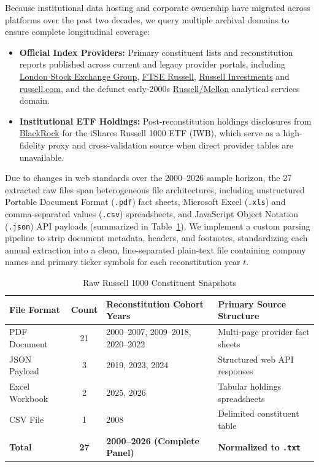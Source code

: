 \medskip

Because institutional data hosting and corporate ownership have migrated across platforms over the past two decades, we query multiple archival domains to ensure complete longitudinal coverage:
\begin{itemize}
	\item \textbf{Official Index Providers:} Primary constituent lists and reconstitution reports published across current and legacy provider portals, including \href{https://lseg.com/}{London Stock Exchange Group}, \href{https://ftserussell.com/}{FTSE Russell}, \href{https://russellinvestments.com/}{Russell Investments} and \href{https://russell.com/}{russell.com}, and the defunct early-2000s \href{https://www.russellmellon.com/}{Russell/Mellon} analytical services domain.
	\item \textbf{Institutional ETF Holdings:} Post-reconstitution holdings disclosures from \href{https://ishares.com/}{BlackRock} for the iShares Russell 1000 ETF (IWB), which serve as a high-fidelity proxy and cross-validation source when direct provider tables are unavailable.
\end{itemize}
Due to changes in web standards over the 2000--2026 sample horizon, the 27 extracted raw files span heterogeneous file architectures, including unstructured Portable Document Format (\texttt{.pdf}) fact sheets, Microsoft Excel (\texttt{.xls}) and comma-separated values (\texttt{.csv}) spreadsheets, and JavaScript Object Notation (\texttt{.json}) API payloads (summarized in Table~\ref{tab:russell_raw_sources}). We implement a custom parsing pipeline to strip document metadata, headers, and footnotes, standardizing each annual extraction into a clean, line-separated plain-text file containing company names and primary ticker symbols for each reconstitution year $t$.
\begin{table}[H]
	\small
	\centering
	\caption{Raw Russell 1000 Constituent Snapshots}
	\label{tab:russell_raw_sources}
	\begin{tabular}{lcll}
		\toprule
		\textbf{File Format} & \textbf{Count} & \textbf{Reconstitution Cohort Years} & \textbf{Primary Source Structure}    \\
		\midrule
		PDF Document         & 21             & 2000--2007, 2009--2018, 2020--2022   & Multi-page provider fact sheets      \\
		JSON Payload         & 3              & 2019, 2023, 2024                     & Structured web API responses         \\
		Excel Workbook       & 2              & 2025, 2026                           & Tabular holdings spreadsheets        \\
		CSV File             & 1              & 2008                                 & Delimited constituent table          \\
		\midrule
		\textbf{Total}       & \textbf{27}    & \textbf{2000--2026 (Complete Panel)} & \textbf{Normalized to \texttt{.txt}} \\
		\bottomrule
	\end{tabular}
\end{table}

